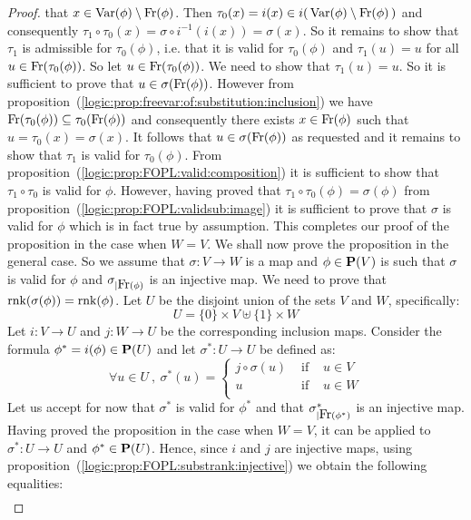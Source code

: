 \begin{proof}
that $x\in\mbox{\rm Var}(\phi)\setminus\mbox{\rm Fr}(\phi)$. Then $\tau_{0}(x)=i(x)\in
i(\,\mbox{\rm Var}(\phi)\setminus\mbox{\rm Fr}(\phi)\,)$ and consequently
$\tau_{1}\circ\tau_{0}(x)=\sigma\circ i^{-1}(i(x))=\sigma(x)$. So it
remains to show that $\tau_{1}$ is admissible for $\tau_{0}(\phi)$,
i.e. that it is valid for $\tau_{0}(\phi)$ and $\tau_{1}(u)=u$ for
all $u\in\mbox{\rm Fr}(\tau_{0}(\phi))$. So let $u\in\mbox{\rm Fr}(\tau_{0}(\phi))$.
We need to show that $\tau_{1}(u)=u$. So it is sufficient to prove
that $u\in\sigma(\mbox{\rm Fr}(\phi))$. However from
proposition~(\ref{logic:prop:freevar:of:substitution:inclusion}) we
have $\mbox{\rm Fr}(\tau_{0}(\phi))\subseteq\tau_{0}(\mbox{\rm Fr}(\phi))$ and
consequently there exists $x\in\mbox{\rm Fr}(\phi)$ such that
$u=\tau_{0}(x)=\sigma(x)$. It follows that $u\in\sigma(\mbox{\rm Fr}(\phi))$
as requested and it remains to show that $\tau_{1}$ is valid for
$\tau_{0}(\phi)$. From
proposition~(\ref{logic:prop:FOPL:valid:composition}) it is
sufficient to show that $\tau_{1}\circ\tau_{0}$ is valid for $\phi$.
However, having proved that
$\tau_{1}\circ\tau_{0}(\phi)=\sigma(\phi)$ from
proposition~(\ref{logic:prop:FOPL:validsub:image}) it is sufficient
to prove that $\sigma$ is valid for $\phi$ which is in fact true by
assumption. This completes our proof of the proposition in the case
when $W=V$. We shall now prove the proposition in the general case.
So we assume that $\sigma:V\to W$ is a map and $\phi\in\mbox{${\bf P}(V)$}$ is such
that $\sigma$ is valid for $\phi$ and $\sigma_{|\mbox{\rm Fr}(\phi)}$ is an
injective map. We need to prove that
$\mbox{\rm rnk}(\sigma(\phi))=\mbox{\rm rnk}(\phi)$. Let $U$ be the disjoint union of
the sets $V$ and $W$, specifically:
    \[
    U=\{0\}\times V\uplus\{1\}\times W
    \]
Let $i:V\to U$ and $j:W\to U$ be the corresponding inclusion maps.
Consider the formula $\phi^{*}=i(\phi)\in{\bf P}(U)$ and let
$\sigma^{*}:U\to U$ be defined as:
    \[
    \forall u\in U\ ,\ \sigma^{*}(u)=\left\{
        \begin{array}{lcl}
        j\circ\sigma(u)&\mbox{\ if\ }&u\in V\\
        u&\mbox{\ if\ }&u\in W\\
        \end{array}
    \right.
    \]
Let us accept for now that $\sigma^{*}$ is valid for $\phi^{*}$ and
that $\sigma^{*}_{|\mbox{\rm Fr}(\phi^{*})}$ is an injective map. Having
proved the proposition in the case when $W=V$, it can be applied to
$\sigma^{*}:U\to U$ and $\phi^{*}\in{\bf P}(U)$. Hence, since $i$
and $j$ are injective maps, using
proposition~(\ref{logic:prop:FOPL:substrank:injective}) we obtain
the following equalities:
    \begin{eqnarray*}

\end{eqnarray*}
\end{proof}
